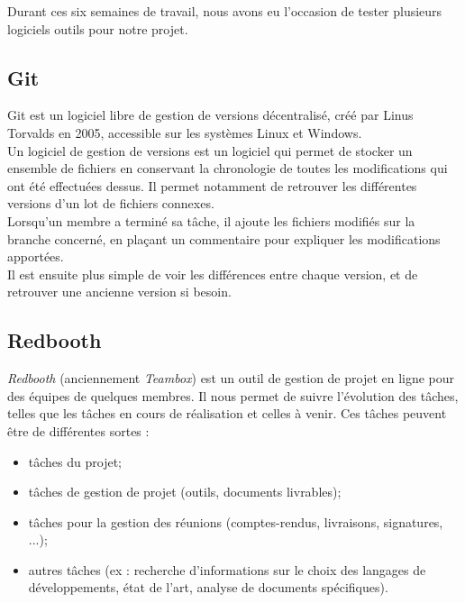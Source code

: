 Durant ces six semaines de travail, nous avons eu l'occasion de tester plusieurs logiciels outils pour notre projet.

\subsection{Git}

Git est un logiciel libre de gestion de versions décentralisé, créé par Linus Torvalds en 2005, accessible sur les systèmes Linux et Windows.\\

Un logiciel de gestion de versions est un logiciel qui permet de stocker un ensemble de fichiers en conservant la chronologie de toutes les modifications qui ont été effectuées dessus. Il permet notamment de retrouver les différentes versions d'un lot de fichiers connexes.\\

Lorsqu'un membre a terminé sa tâche, il ajoute les fichiers modifiés sur la branche concerné, en plaçant un commentaire pour expliquer les modifications apportées.\\

Il est ensuite plus simple de voir les différences entre chaque version, et de retrouver une ancienne version si besoin.\\

\subsection{Redbooth}

\textit{Redbooth} (anciennement \textit{Teambox}) est un outil de gestion de projet en ligne pour des équipes de quelques membres. Il nous permet de suivre l'évolution des tâches, telles que les tâches en cours de réalisation et celles à venir. Ces tâches peuvent être de différentes sortes :
\begin{itemize}
\item tâches du projet;
\item tâches de gestion de projet (outils, documents livrables);
\item tâches pour la gestion des réunions (comptes-rendus, livraisons, signatures, ...);
\item autres tâches (ex : recherche d'informations sur le choix des langages de développements, état de l'art, analyse de documents spécifiques).\\
\end{itemize}


